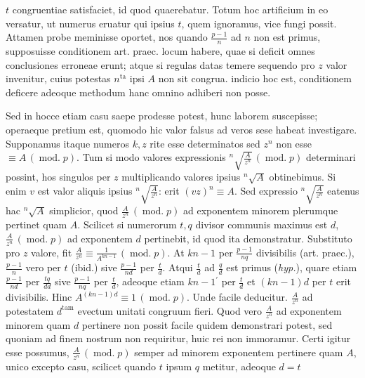 $t$ congruentiae satisfaciet, id quod quaerebatur. Totum hoc artificium in eo versatur, ut numerus eruatur qui ipsius $t$, quem ignoramus, vice fungi possit. Attamen probe meminisse oportet, nos quando $\frac{p-1}{n}$ ad $n$ non est primus, supposuisse conditionem art. praec. locum habere, quae si deficit omnes conclusiones erroneae erunt; atque si regulas datas temere sequendo pro $z$ valor invenitur, cuius potestas $n^{\mathrm{ta}}$ ipsi $A$ non sit congrua. indicio hoc est, conditionem deficere adeoque methodum hanc omnino adhiberi non posse.


Sed in hocce etiam casu saepe prodesse potest, hunc laborem suscepisse; operaeque pretium est, quomodo hic valor falsus ad veros sese habeat investigare. Supponamus itaque numeros $k,z$ rite esse determinatos sed $z^n$ non esse $\equiv A\,(\operatorname{mod.}p)$. Tum si modo valores expressionis ${}^{n}\!\surd{\frac{A}{z^n}}\,(\operatorname{mod.}p)$ determinari possint, hos singulos per $z$ multiplicando valores ipsius ${}^{n}\!\surd{A}$ obtinebimus. Si enim $v$ est valor aliquis ipsius ${}^{n}\!\surd{\frac{A}{z^n}}$: erit $(vz)^n\equiv A$. Sed expressio ${}^{n}\!\surd{\frac{A}{z^n}}$ eatenus hac ${}^{n}\!\surd{A}$ simplicior, quod $\frac{A}{z^n}\,(\operatorname{mod.}p)$ ad exponentem minorem plerumque pertinet quam $A$. Scilicet si numerorum $t,q$ divisor communis maximus est $d$, $\frac{A}{z^n}\,(\operatorname{mod.}p)$ ad exponentem $d$ pertinebit, id quod ita demonstratur. Substituto pro $z$ valore, fit $\frac{A}{z^n}\equiv\frac{1}{A^{kn-1}}\,(\operatorname{mod.}p)$. At $kn-1$ per $\frac{p-1}{nq}$ divisibilis (art. praec.), $\frac{p-1}{n}$ vero per $t$ (ibid.) sive $\frac{p-1}{nd}$ per $\frac{t}{d}$. Atqui $\frac{t}{d}$ ad $\frac{q}{d}$ est primus (\emph{hyp.}), quare etiam $\frac{p-1}{nd}$ per $\frac{tq}{dd}$ sive $\frac{p-1}{nq}$ per $\frac{t}{d}$, adeoque etiam $kn-1{}^{\prime}$ per $\frac{t}{d}$ et $(kn-1)d$ per $t$ erit divisibilis. Hinc $A^{(kn-1)d}\equiv1\,(\operatorname{mod.}p)$. Unde facile deducitur. $\frac{A}{z^n}$ ad potestatem $d^{\mathrm{tam}}$ evectum unitati congruum fieri. Quod vero $\frac{A}{z^n}$ ad exponentem minorem quam $d$ pertinere non possit facile quidem demonstrari potest, sed quoniam ad finem nostrum non requiritur, huic rei non immoramur. Certi igitur esse possumus, $\frac{A}{z^n}\,(\operatorname{mod.}p)$ semper ad minorem exponentem pertinere quam $A$, unico excepto casu, scilicet quando $t$ ipsum $q$ metitur, adeoque $d=t$

